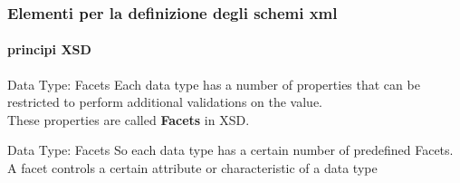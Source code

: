 


\begin{frame}
	\frametitle{Elementi per la definizione degli schemi xml}
	\framesubtitle{principi XSD}
	\addtocounter{nframe}{1}

	\begin{block}{Data Type: Facets}
		Each data type has a number of properties that can be restricted to perform additional validations on the value.
		\\These properties are called \textbf{Facets} in XSD.
	\end{block}

	\begin{block}{Data Type: Facets}
		So each data type has a certain number of predefined Facets.
		\\A facet controls a certain attribute or characteristic of a data type
	\end{block}

\end{frame}

